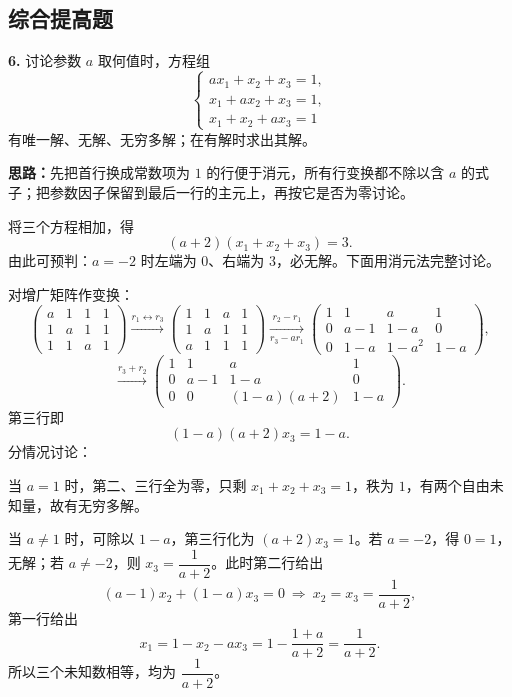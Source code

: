 \else \answerarea[8] \fi%

\subsection{综合提高题}

\textbf{6.} 讨论参数 \(a\) 取何值时，方程组
\[
\begin{cases}
ax_1+x_2+x_3=1,\\
x_1+ax_2+x_3=1,\\
x_1+x_2+ax_3=1
\end{cases}
\]
有唯一解、无解、无穷多解；在有解时求出其解。

\ifshowsolutions%
\textbf{思路：}先把首行换成常数项为 \(1\) 的行便于消元，所有行变换都不除以含 \(a\) 的式子；把参数因子保留到最后一行的主元上，再按它是否为零讨论。

将三个方程相加，得
\[
(a+2)(x_1+x_2+x_3)=3.
\]
由此可预判：\(a=-2\) 时左端为 \(0\)、右端为 \(3\)，必无解。下面用消元法完整讨论。

对增广矩阵作变换：
\[
\left(\begin{array}{ccc|c}
a&1&1&1\\1&a&1&1\\1&1&a&1
\end{array}\right)
\xrightarrow{r_1\leftrightarrow r_3}
\left(\begin{array}{ccc|c}
1&1&a&1\\1&a&1&1\\a&1&1&1
\end{array}\right)
\xrightarrow[r_3-ar_1]{r_2-r_1}
\left(\begin{array}{ccc|c}
1&1&a&1\\0&a-1&1-a&0\\0&1-a&1-a^2&1-a
\end{array}\right),
\]
\[
\xrightarrow{r_3+r_2}
\left(\begin{array}{ccc|c}
1&1&a&1\\0&a-1&1-a&0\\0&0&(1-a)(a+2)&1-a
\end{array}\right).
\]
第三行即
\[
(1-a)(a+2)x_3=1-a.
\]
分情况讨论：

当 \(a=1\) 时，第二、三行全为零，只剩 \(x_1+x_2+x_3=1\)，秩为 \(1\)，有两个自由未知量，故有无穷多解。

当 \(a\neq1\) 时，可除以 \(1-a\)，第三行化为 \((a+2)x_3=1\)。若 \(a=-2\)，得 \(0=1\)，无解；若 \(a\neq-2\)，则 \(x_3=\dfrac1{a+2}\)。此时第二行给出
\[
(a-1)x_2+(1-a)x_3=0\ \Longrightarrow\ x_2=x_3=\frac1{a+2},
\]
第一行给出
\[
x_1=1-x_2-ax_3=1-\frac{1+a}{a+2}=\frac1{a+2}.
\]
所以三个未知数相等，均为 \(\dfrac1{a+2}\)。

